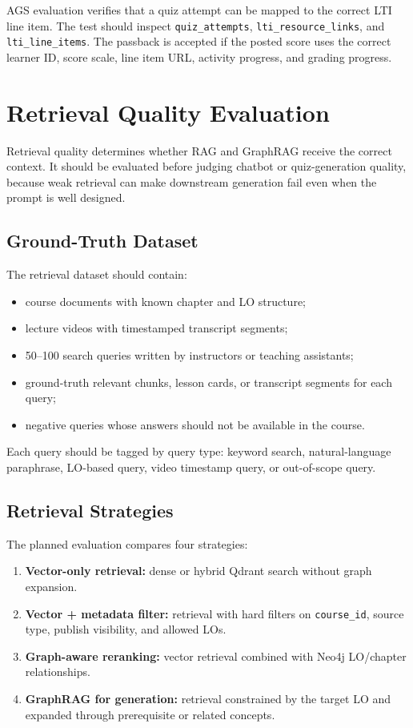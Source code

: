 AGS evaluation verifies that a quiz attempt can be mapped to the correct LTI
line item. The test should inspect \texttt{quiz\_attempts},
\texttt{lti\_resource\_links}, and \texttt{lti\_line\_items}. The passback is
accepted if the posted score uses the correct learner ID, score scale, line
item URL, activity progress, and grading progress.

\section{Retrieval Quality Evaluation}

Retrieval quality determines whether RAG and GraphRAG receive the correct
context. It should be evaluated before judging chatbot or quiz-generation
quality, because weak retrieval can make downstream generation fail even when
the prompt is well designed.

\subsection{Ground-Truth Dataset}

The retrieval dataset should contain:

\begin{itemize}
    \item course documents with known chapter and LO structure;
    \item lecture videos with timestamped transcript segments;
    \item 50--100 search queries written by instructors or teaching
          assistants;
    \item ground-truth relevant chunks, lesson cards, or transcript segments
          for each query;
    \item negative queries whose answers should not be available in the course.
\end{itemize}

Each query should be tagged by query type: keyword search, natural-language
paraphrase, LO-based query, video timestamp query, or out-of-scope query.

\subsection{Retrieval Strategies}

The planned evaluation compares four strategies:

\begin{enumerate}
    \item \textbf{Vector-only retrieval:} dense or hybrid Qdrant search without
          graph expansion.
    \item \textbf{Vector + metadata filter:} retrieval with hard filters on
          \texttt{course\_id}, source type, publish visibility, and allowed
          LOs.
    \item \textbf{Graph-aware reranking:} vector retrieval combined with
          Neo4j LO/chapter relationships.
    \item \textbf{GraphRAG for generation:} retrieval constrained by the target
          LO and expanded through prerequisite or related concepts.
\end{enumerate}

